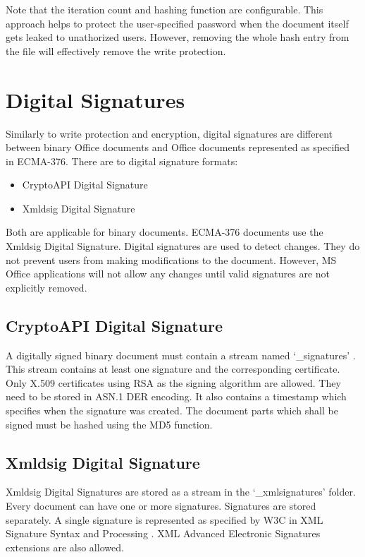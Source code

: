 \documentclass[11pt,oneside]{fithesis2}
\begin{document}
Note that the iteration count and hashing function are configurable. This approach helps to protect the user-specified password when the document itself gets leaked to unathorized users. However, removing the whole hash entry from the file will effectively remove the write protection.

\section{Digital Signatures}\label{data_integrity}

Similarly to write protection and encryption, digital signatures are different between binary Office documents and Office documents represented as specified in ECMA-376. There are to digital signature formats:

\begin{itemize}
\setlength\itemsep{0.1em}
	\item{CryptoAPI Digital Signature}
	\item{Xmldsig Digital Signature}
\end{itemize}

Both are applicable for binary documents. ECMA-376 documents use the Xmldsig Digital Signature. Digital signatures are used to detect changes. They do not prevent users from making modifications to the document. However, MS Office applications will not allow any changes until valid signatures are not explicitly removed.

\subsection{CryptoAPI Digital Signature} 

A digitally signed binary document must contain a stream named ‘\_signatures’ . This stream contains at least one signature and the corresponding certificate. Only X.509 certificates using RSA as the signing algorithm are allowed. They need to be stored in ASN.1 DER encoding. It also contains a timestamp which specifies when the signature was created. The document parts which shall be signed must be hashed using the MD5 function. 


\subsection{Xmldsig Digital Signature}

Xmldsig Digital Signatures are stored as a stream in the ‘\_xmlsignatures’ folder. Every document can have one or more signatures. Signatures are stored separately. A single signature is represented as specified by W3C in XML Signature Syntax and Processing \cite{xmlsig}. XML Advanced Electronic Signatures \cite{xades} extensions are also allowed.
\end{document}
